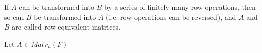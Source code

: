 \begin{definition}
    If $A$ can be transformed into $B$ by a series of finitely many row operations, then so can $B$ be transformed into $A$ (i.e. row operations can be reversed), and $A$ and $B$ are called row equivalent matrices.
\end{definition}

\begin{definition}
    Let $A \in Matr_n(F)$
\end{definition}

\newpage







